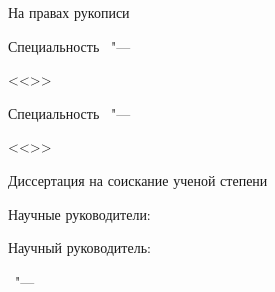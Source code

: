 \thispagestyle{empty}
\begin{center}
\thesisOrganization
\end{center}
%
\vspace{0pt plus4fill} %

\begin{flushright}
На правах рукописи
\end{flushright}
%
\vspace{0pt plus2fill} %
\begin{center}
{\large \thesisAuthor}
\end{center}
%
\vspace{0pt plus1fill} %
\begin{center}
\textbf {\large %
\thesisTitle}

\vspace{0pt plus2fill} %
{%
Специальность \thesisSpecialtyNumber\ "---

<<\thesisSpecialtyTitle>>
}

\ifdefined\thesisSpecialtyTwoNumber
{%
Специальность \thesisSpecialtyTwoNumber\ "---

<<\thesisSpecialtyTwoTitle>>
}
\fi

\vspace{0pt plus2fill} %
Диссертация на соискание ученой степени

\thesisDegree
\end{center}
%
\vspace{0pt plus4fill} %
\begin{flushright}
\ifdefined\supervisorTwoFio
Научные руководители:

\supervisorRegalia

\ifdefined\supervisorDead
\framebox{\supervisorFio}
\else
\supervisorFio
\fi

\supervisorTwoRegalia

\ifdefined\supervisorTwoDead
\framebox{\supervisorTwoFio}
\else
\supervisorTwoFio
\fi
\else
Научный руководитель:

\supervisorRegalia

\ifdefined\supervisorDead
\framebox{\supervisorFio}
\else
\supervisorFio
\fi
\fi

\end{flushright}
%
\vspace{0pt plus4fill} %
{\centering\thesisCity\ "--- \thesisYear\par}
